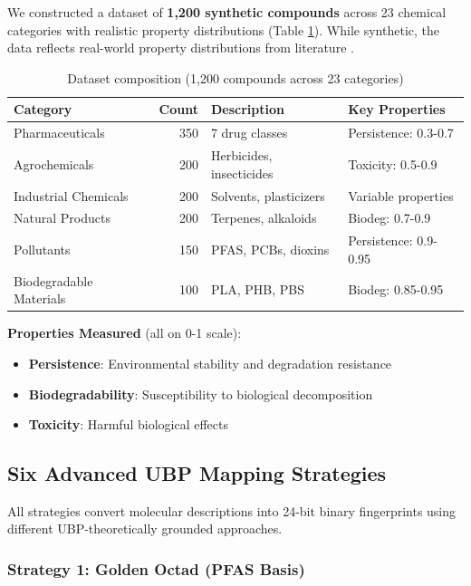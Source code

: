 \documentclass[11pt,letterpaper]{article}
\begin{document}
We constructed a dataset of \textbf{1,200 synthetic compounds} across 23 chemical categories with realistic property distributions (Table \ref{tab:dataset}). While synthetic, the data reflects real-world property distributions from literature \cite{QSARBiodeg2024, Cassani2013}.

\begin{table}[H]
\centering
\caption{Dataset composition (1,200 compounds across 23 categories)}
\label{tab:dataset}
\begin{tabular}{lrll}
\toprule
\textbf{Category} & \textbf{Count} & \textbf{Description} & \textbf{Key Properties} \\
\midrule
Pharmaceuticals & 350 & 7 drug classes & Persistence: 0.3-0.7 \\
Agrochemicals & 200 & Herbicides, insecticides & Toxicity: 0.5-0.9 \\
Industrial Chemicals & 200 & Solvents, plasticizers & Variable properties \\
Natural Products & 200 & Terpenes, alkaloids & Biodeg: 0.7-0.9 \\
Pollutants & 150 & PFAS, PCBs, dioxins & Persistence: 0.9-0.95 \\
Biodegradable Materials & 100 & PLA, PHB, PBS & Biodeg: 0.85-0.95 \\
\bottomrule
\end{tabular}
\end{table}

\textbf{Properties Measured} (all on 0-1 scale):
\begin{itemize}
    \item \textbf{Persistence}: Environmental stability and degradation resistance
    \item \textbf{Biodegradability}: Susceptibility to biological decomposition
    \item \textbf{Toxicity}: Harmful biological effects
\end{itemize}

\subsection{Six Advanced UBP Mapping Strategies}

All strategies convert molecular descriptions into 24-bit binary fingerprints using different UBP-theoretically grounded approaches.

\subsubsection{Strategy 1: Golden Octad (PFAS Basis)}
\end{document}
